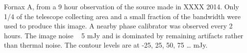 Fornax A, from a 9 hour observation of the source made in XXXX 2014. Only 1/4 of the telescope collecting area and a small fraction of the bandwidth were used to produce this image. A nearby phase calibrator was observed every 2 hours. The image noise ~ 5 mJy and is dominated by remaining artifacts rather than thermal noise. The contour levels are at -25, 25, 50, 75 … mJy.  